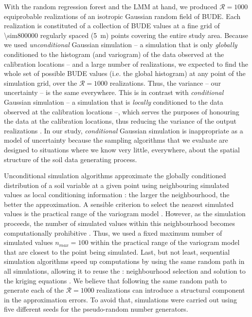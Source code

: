 With the random regression forest and the LMM at hand, we produced $\mathcal{R} = 1000$ equiprobable 
realizations of an isotropic Gaussian random field of BUDE. Each realization is constituted of a collection of 
BUDE values at a fine grid of \num{\sim800000} regularly spaced (\SI{5}{\metre}) points covering the entire 
study area. Because we used \emph{unconditional} Gaussian simulation -- a simulation that is only 
\emph{globally} conditioned to the histogram (and variogram) of the data observed at the calibration locations 
\cite{Goovaerts1997} -- and a large number of realizations, we expected to find the whole set of possible 
BUDE values (i.e. the global histogram) at any point of the simulation grid, over the $\mathcal{R} = 1000$ 
realizations. Thus, the variance -- our uncertainty -- is the same everywhere. This is in contrast with 
\emph{conditional} Gaussian simulation -- a simulation that is \emph{locally} conditioned to the data observed 
at the calibration locations --, which serves the purposes of honouring the data at the calibration locations, 
thus reducing the variance of the output realizations \cite{Goovaerts1997}. In our study, \emph{conditional} 
Gaussian simulation is inappropriate as a model of uncertainty because the sampling algorithms that we 
evaluate 
are designed to situations where we know very little, everywhere, about the spatial structure of the soil data 
generating process.

Unconditional simulation algorithms approximate the globally conditioned distribution of a soil variable at a 
given point using neighbouring simulated values as local conditioning information \cite{Goovaerts1997}: the 
larger the neighbourhood, the better the approximation. A sensible criterion to select the nearest simulated 
values is the practical range of the variogram model \cite{Pebesma2004}. However, as the simulation proceeds, 
the number of simulated values within this neighbourhood becomes computationally prohibitive 
\cite{WebsterEtAl2007}. Thus, we used a fixed maximum number of simulated values $n_{max} = 100$ 
within the practical range of the variogram model that are closest to the point being simulated. Last, but not 
least, sequential simulation algorithms speed up computations by using the same random path in all 
simulations, allowing it to reuse the : neighbourhood selection and solution to the 
kriging equations \cite{Pebesma2004}. We believe that following the same random path to generate each of the 
$\mathcal{R} = 1000$ realizations can introduce a structural component in the approximation errors. To avoid 
that, simulations were carried out using five different seeds for the pseudo-random number generators.


